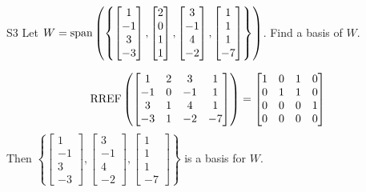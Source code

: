 \documentclass{sbgLAquiz}
\begin{document}
\begin{extract}\newpage\end{extract}
\begin{problem}{S3}  
Let $W={\rm span}\left( \left\{ \begin{bmatrix} 1 \\ -1 \\ 3 \\ -3 \end{bmatrix},\begin{bmatrix} 2 \\ 0 \\ 1 \\ 1 \end{bmatrix}, \begin{bmatrix} 3 \\ -1 \\ 4 \\ -2 \end{bmatrix},  \begin{bmatrix} 1 \\ 1 \\ 1 \\ -7 \end{bmatrix} \right\}\right)$.  Find a basis of $W$.
\end{problem}
\begin{solution}
$$ \operatorname{RREF} \left( \begin{bmatrix} 1 & 2 & 3 & 1 \\ -1 & 0 & -1 & 1 \\ 3 & 1 & 4 & 1 \\ -3 & 1 & -2 & -7 \end{bmatrix} \right) =  \begin{bmatrix} 1 & 0 & 1 & 0 \\ 0 & 1 & 1 & 0 \\ 0 & 0 & 0 & 1 \\ 0 & 0 & 0 & 0\end{bmatrix}$$
Then  $\left\{ \begin{bmatrix} 1 \\ -1 \\ 3 \\ -3 \end{bmatrix}, \begin{bmatrix} 3 \\ -1 \\ 4 \\ -2 \end{bmatrix},  \begin{bmatrix} 1 \\ 1 \\ 1 \\ -7 \end{bmatrix} \right\}$ is a basis for $W$.
\end{solution}
\end{document}
